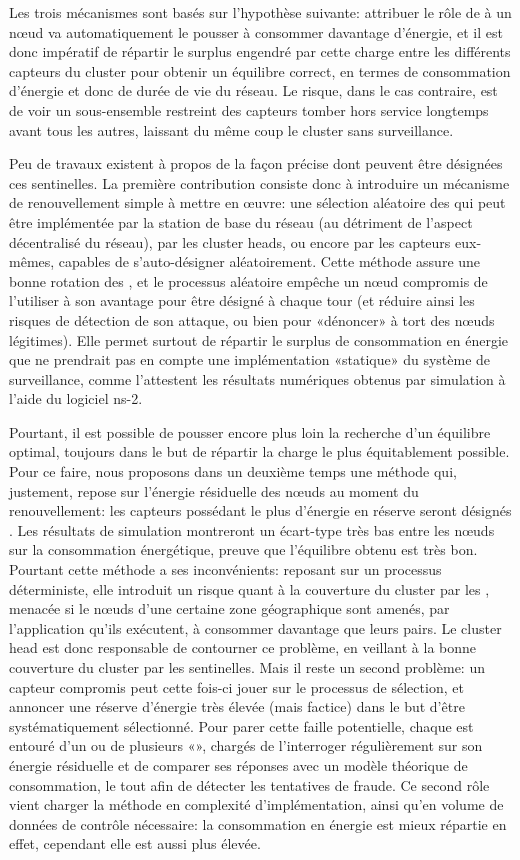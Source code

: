 Les trois mécanismes sont basés sur l'hypothèse suivante: attribuer le rôle de \cnt à un nœud va automatiquement le pousser à consommer davantage d'énergie, et il est donc impératif de répartir le surplus engendré par cette charge entre les différents capteurs du cluster pour obtenir un équilibre correct, en termes de consommation d'énergie et donc de durée de vie du réseau.
Le risque, dans le cas contraire, est de voir un sous-ensemble restreint des capteurs tomber hors service longtemps avant tous les autres, laissant du même coup le cluster sans surveillance.

Peu de travaux existent à propos de la façon précise dont peuvent être désignées ces sentinelles.
La première contribution consiste donc à introduire un mécanisme de renouvellement simple à mettre en œuvre: une sélection aléatoire des \cnst qui peut être implémentée par la station de base du réseau (au détriment de l'aspect décentralisé du réseau), par les cluster heads, ou encore par les capteurs eux-mêmes, capables de s'auto-désigner aléatoirement.
Cette méthode assure une bonne rotation des \cnst, et le processus aléatoire empêche un nœud compromis de l'utiliser à son avantage pour être désigné à chaque tour (et réduire ainsi les risques de détection de son attaque, ou bien pour «dénoncer» à tort des nœuds légitimes).
Elle permet surtout de répartir le surplus de consommation en énergie que ne prendrait pas en compte une implémentation «statique» du système de surveillance, comme l'attestent les résultats numériques obtenus par simulation à l'aide du logiciel \textsf{ns-2}.

Pourtant, il est possible de pousser encore plus loin la recherche d'un équilibre optimal, toujours dans le but de répartir la charge le plus équitablement possible.
Pour ce faire, nous proposons dans un deuxième temps une méthode qui, justement, repose sur l'énergie résiduelle des nœuds au moment du renouvellement: les capteurs possédant le plus d'énergie en réserve seront désignés \cnst.
Les résultats de simulation montreront un écart-type très bas entre les nœuds sur la consommation énergétique, preuve que l'équilibre obtenu est très bon.
Pourtant cette méthode a ses inconvénients: reposant sur un processus déterministe, elle introduit un risque quant à la couverture du cluster par les \cnst, menacée si le nœuds d'une certaine zone géographique sont amenés, par l'application qu'ils exécutent, à consommer davantage que leurs pairs.
Le cluster head est donc responsable de contourner ce problème, en veillant à la bonne couverture du cluster par les sentinelles.
Mais il reste un second problème: un capteur compromis peut cette fois-ci jouer sur le processus de sélection, et annoncer une réserve d'énergie très élevée (mais factice) dans le but d'être systématiquement sélectionné.
Pour parer cette faille potentielle, chaque \cnt est entouré d'un ou de plusieurs «\vnst», chargés de l'interroger régulièrement sur son énergie résiduelle et de comparer ses réponses avec un modèle théorique de consommation, le tout afin de détecter les tentatives de fraude.
Ce second rôle vient charger la méthode en complexité d'implémentation, ainsi qu'en volume de données de contrôle nécessaire: la consommation en énergie est mieux répartie en effet, cependant elle est aussi plus élevée.

